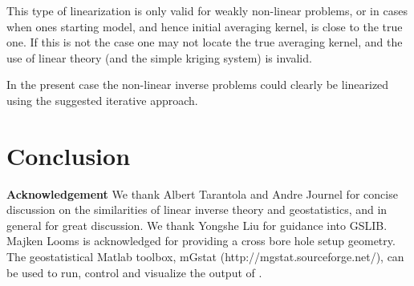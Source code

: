 \documentclass[12t]{article}
\begin{document}
This type of linearization is only valid for weakly non-linear problems, or in cases when ones starting model, and hence initial averaging kernel, is close to the true one. If this is not the case one may not locate the true averaging kernel, and the use of linear theory (and the simple kriging system) is invalid.

In the present case the non-linear inverse problems could clearly be linearized using the suggested iterative approach.
\vspace{1cm}

\section{Conclusion}
\label{sec:conclusion}

\textbf{Acknowledgement}
We thank Albert Tarantola and Andre Journel for concise discussion on the similarities of linear inverse theory and geostatistics, and in general for great discussion. We thank Yongshe Liu for guidance into GSLIB. Majken Looms is acknowledged for providing a cross bore hole setup geometry. The geostatistical Matlab toolbox, mGstat (http://mgstat.sourceforge.net/), can be used to run, control and visualize the output of \visimprog.


\nocite{Robertson:2006:DSSIM}
\nocite{Soares:2001:DSS}
\nocite{Oz:2003:DSSIM-HR}
\nocite{Journel:1978:MG}
\nocite{Journel:1999:VOL}
\nocite{Goovaerts:1997}
\nocite{Soares:2001:DSS}
\nocite{Oz:2003:DSSIM-HR}
\nocite{Deutsch:2000:DSSIM-HR}
\nocite{GSLIB}
\nocite{Hansen:2006:geostatinv}
\nocite{Liu:2006:FFTcov}

\nocite{SrinavasanJournel:1998}
\nocite{GomezHernandez:2000:CapeTown}
\nocite{GomezHernandez:2004:Banff}

\nocite{Gloaguen:2005}
\nocite{Gloaguen:2004:Banff}
\nocite{Hansen:VISIM}


                     
\end{document}
